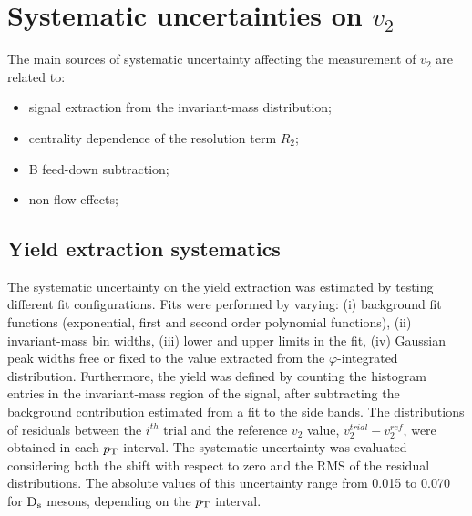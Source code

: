 \section{Systematic uncertainties on $v_2$}
\label{sec:systsectionV2}
The main sources of systematic uncertainty affecting the measurement of 
$v_2$ are related to: 
\begin{itemize}
\item signal extraction from the invariant-mass
distribution;
\item centrality dependence of the resolution term $R_2$;
\item B feed-down subtraction;
\item non-flow effects;
\end{itemize}

\subsection{Yield extraction systematics}
\label{sec:rawYv2}
The systematic uncertainty on the yield extraction was 
estimated by testing different fit configurations.
Fits were performed by varying: (i) background fit functions
(exponential, first and second order polynomial functions), (ii) invariant-mass bin
widths, (iii) lower and upper limits in the fit, (iv) Gaussian peak widths free or fixed to the value
extracted from the $\varphi$-integrated distribution. Furthermore, the yield was defined by
counting the histogram entries in the invariant-mass region of the signal, after subtracting the background
contribution estimated from a fit to the side bands. The distributions of
residuals between the $i^{th}$ trial and the reference $v_2$ value, 
$v_2^{trial}-v_2^{ref}$, were obtained in each $p_{\rm T}$ interval. 
The systematic uncertainty was evaluated
considering both the shift with respect to zero and the RMS of the residual
distributions. The absolute values of this uncertainty range from 
0.015 to 0.070 for ${\rm D_s}$ mesons, depending on the $p_{\rm T}$ interval.

